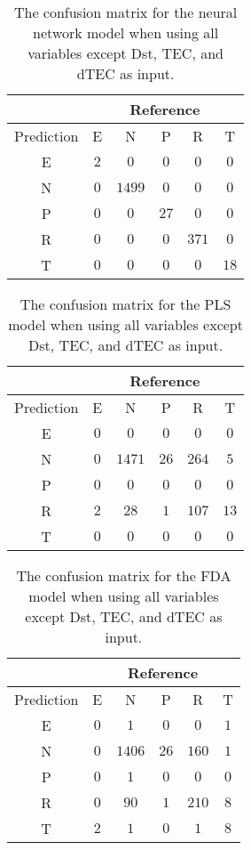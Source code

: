 \begin{table}[!ht]
	\centering
	\begin{tabular}{|c|c|c|c|c|c|}
		\hline
		 & \multicolumn{5}{|c|}{Reference} \\ \hline
		 Prediction & E & N & P & R & T \\ \hline
		 E & $2$ & $0$ & $0$ & $0$ & $0$ \\ \hline
		 N & $0$ & $1499$ & $0$ & $0$ & $0$ \\ \hline
		 P & $0$ & $0$ & $27$ & $0$ & $0$ \\ \hline
		 R & $0$ & $0$ & $0$ & $371$ & $0$ \\ \hline
		 T & $0$ & $0$ & $0$ & $0$ & $18$ \\ \hline
	\end{tabular}
	\caption{The confusion matrix for the neural network model when using all variables except Dst, TEC, and dTEC as input.}
	\label{tab:cm:noTEC:nnet}
\end{table}

\begin{table}[!ht]
	\centering
	\begin{tabular}{|c|c|c|c|c|c|}
		\hline
		 & \multicolumn{5}{|c|}{Reference} \\ \hline
		 Prediction & E & N & P & R & T \\ \hline
		 E & $0$ & $0$ & $0$ & $0$ & $0$ \\ \hline
		 N & $0$ & $1471$ & $26$ & $264$ & $5$ \\ \hline
		 P & $0$ & $0$ & $0$ & $0$ & $0$ \\ \hline
		 R & $2$ & $28$ & $1$ & $107$ & $13$ \\ \hline
		 T & $0$ & $0$ & $0$ & $0$ & $0$ \\ \hline
	\end{tabular}
	\caption{The confusion matrix for the PLS model when using all variables except Dst, TEC, and dTEC as input.}
	\label{tab:cm:noTEC:pls}
\end{table}

\begin{table}[!ht]
	\centering
	\begin{tabular}{|c|c|c|c|c|c|}
		\hline
		 & \multicolumn{5}{|c|}{Reference} \\ \hline
		 Prediction & E & N & P & R & T \\ \hline
		 E & $0$ & $1$ & $0$ & $0$ & $1$ \\ \hline
		 N & $0$ & $1406$ & $26$ & $160$ & $1$ \\ \hline
		 P & $0$ & $1$ & $0$ & $0$ & $0$ \\ \hline
		 R & $0$ & $90$ & $1$ & $210$ & $8$ \\ \hline
		 T & $2$ & $1$ & $0$ & $1$ & $8$ \\ \hline
	\end{tabular}
	\caption{The confusion matrix for the FDA model when using all variables except Dst, TEC, and dTEC as input.}
	\label{tab:cm:noTEC:fda}
\end{table}

